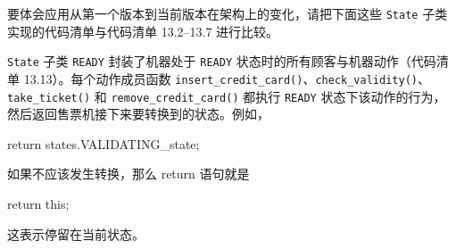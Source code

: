 要体会应用从第一个版本到当前版本在架构上的变化，请把下面这些 \texttt{State} 子类实现的代码清单与代码清单 13.2–13.7 进行比较。

\texttt{State} 子类 \texttt{READY} 封装了机器处于 \texttt{READY} 状态时的所有顾客与机器动作（代码清单 13.13）。每个动作成员函数 \texttt{insert\_\allowbreak{}credit\_\allowbreak{}card(\allowbreak{})\allowbreak{}}、\texttt{check\_\allowbreak{}validity(\allowbreak{})\allowbreak{}}、\texttt{take\_\allowbreak{}ticket(\allowbreak{})\allowbreak{}} 和 \texttt{remove\_\allowbreak{}credit\_\allowbreak{}card(\allowbreak{})\allowbreak{}} 都执行 \texttt{READY} 状态下该动作的行为，然后返回售票机接下来要转换到的状态。例如，

\begin{codebox}
return states.VALIDATING_state;
\end{codebox}

如果不应该发生转换，那么 return 语句就是

\begin{codebox}
return this;
\end{codebox}

这表示停留在当前状态。


